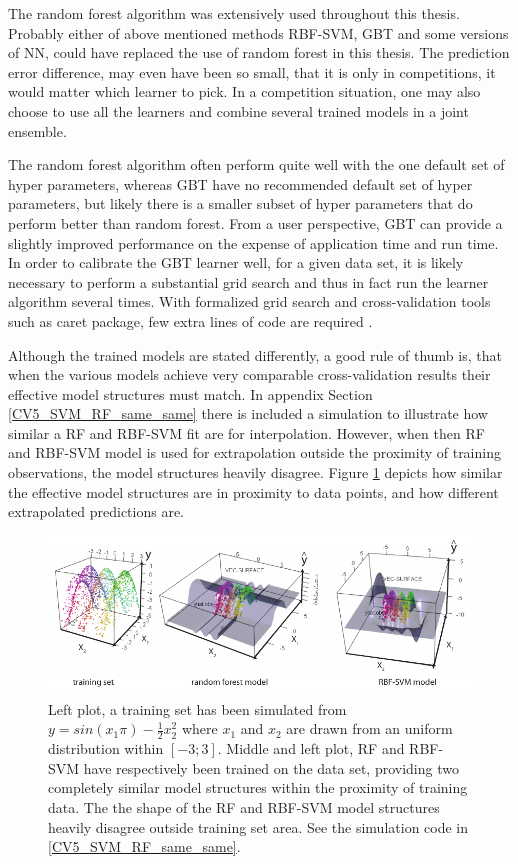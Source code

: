 The random forest algorithm was extensively used throughout this thesis. Probably either of above mentioned methods RBF-SVM, GBT and some versions of NN, could have replaced the use of random forest in this thesis. The prediction error difference, may even have been so small, that it is only in competitions, it would matter which learner to pick. In a competition situation, one may also choose to use all the learners and combine several trained models in a joint ensemble. 

The random forest algorithm often perform quite well with the one default set of hyper parameters, whereas GBT have no recommended default set of hyper parameters, but likely there is a smaller subset of hyper parameters that do perform better than random forest. From a user perspective, GBT can provide a slightly improved performance on the expense of application time and run time. In order to calibrate the GBT learner well, for a given data set, it is likely necessary to perform a substantial grid search and thus in fact run the learner algorithm several times. With formalized grid search and cross-validation tools such as caret package, few extra lines of code are required \cite{kuhn2015short}.

Although the trained models are stated differently, a good rule of thumb is, that when the various models achieve very comparable cross-validation results their effective model structures must match. In appendix Section \ref{CV5_SVM_RF_same_same} there is included a simulation to illustrate how similar a RF and RBF-SVM fit are for interpolation. However, when then RF and RBF-SVM model is used for extrapolation outside the proximity of training observations, the model structures heavily disagree. Figure \ref{svmVSrf} depicts how similar the effective model structures are in proximity to data points, and how different extrapolated predictions are.

\begin{figure}[!htbp]
\includegraphics[width=\textwidth,height=\textheight,keepaspectratio]{graphics/svmVSrf.pdf}
\caption{Left plot, a training set has been simulated from $y = sin(x_1 \pi) − \frac 1 2 x_2^2$ where $x_1$ and $x_2$ are drawn from an uniform distribution within $[-3;3]$. Middle and left plot, RF and RBF-SVM have respectively been trained on the data set, providing two completely similar model structures within the proximity of training data. The the shape of the RF and RBF-SVM model structures heavily disagree outside training set area. See the simulation code in \ref{CV5_SVM_RF_same_same}.} 
\label{svmVSrf}
\end{figure}

